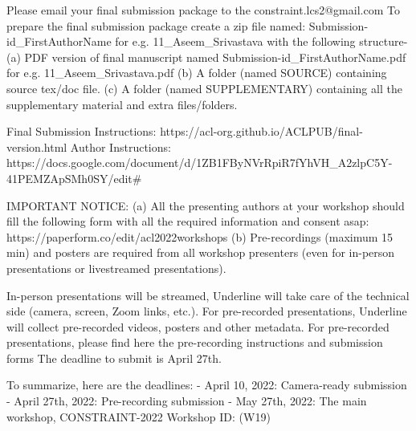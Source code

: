 

Please email your final submission package to the constraint.lcs2@gmail.com
To prepare the final submission package create a zip file named: Submission-id_FirstAuthorName for e.g. 11_Aseem_Srivastava with the following structure-
(a) PDF version of final manuscript named Submission-id_FirstAuthorName.pdf for e.g. 11_Aseem_Srivastava.pdf
(b) A folder (named SOURCE) containing source tex/doc file.
(c) A folder (named SUPPLEMENTARY) containing all the supplementary material and extra files/folders.


Final Submission Instructions: https://acl-org.github.io/ACLPUB/final-version.html
Author Instructions: https://docs.google.com/document/d/1ZB1FByNVrRpiR7fYhVH_A2zlpC5Y-41PEMZApSMh0SY/edit#


IMPORTANT NOTICE:
(a) All the presenting authors at your workshop should fill the following form with all the required information and consent asap: https://paperform.co/edit/acl2022workshops
(b) Pre-recordings (maximum 15 min) and posters are required from all workshop presenters (even for in-person presentations or livestreamed presentations).

In-person presentations will be streamed, Underline will take care of the technical side (camera, screen, Zoom links, etc.). For pre-recorded presentations, Underline will collect pre-recorded videos, posters and other metadata. For pre-recorded presentations, please find here the pre-recording instructions and submission forms  The deadline to submit is April 27th.


To summarize, here are the deadlines:
- April 10, 2022: Camera-ready submission
- April 27th, 2022: Pre-recording submission
- May 27th, 2022: The main workshop, CONSTRAINT-2022 Workshop ID: (W19)

